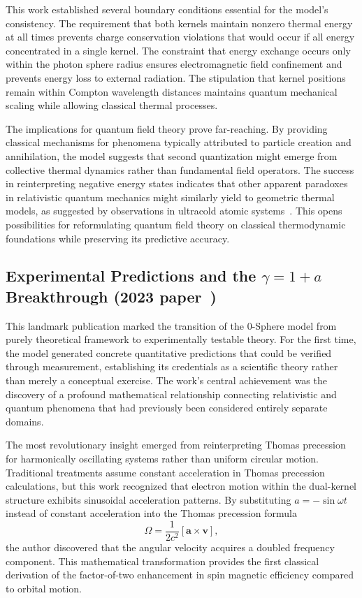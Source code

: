 \documentclass[%
 reprint,
 amsmath,amssymb,
 aps,
]{revtex4-1}
\numberwithin{equation}{section}%
\begin{document}
This work established several boundary conditions essential for the model's consistency. The requirement that both kernels maintain nonzero thermal energy at all times prevents charge conservation violations that would occur if all energy concentrated in a single kernel. The constraint that energy exchange occurs only within the photon sphere radius ensures electromagnetic field confinement and prevents energy loss to external radiation. The stipulation that kernel positions remain within Compton wavelength distances maintains quantum mechanical scaling while allowing classical thermal processes.

The implications for quantum field theory prove far-reaching. By providing classical mechanisms for phenomena typically attributed to particle creation and annihilation, the model suggests that second quantization might emerge from collective thermal dynamics rather than fundamental field operators. The success in reinterpreting negative energy states indicates that other apparent paradoxes in relativistic quantum mechanics might similarly yield to geometric thermal models, as suggested by observations in ultracold atomic systems~\cite{zhang2013}. This opens possibilities for reformulating quantum field theory on classical thermodynamic foundations while preserving its predictive accuracy.

\subsection{Experimental Predictions and the $\gamma = 1 + a$ Breakthrough (2023 paper~\cite{hanamura2309.0047})}

This landmark publication marked the transition of the 0-Sphere model from purely theoretical framework to experimentally testable theory. For the first time, the model generated concrete quantitative predictions that could be verified through measurement, establishing its credentials as a scientific theory rather than merely a conceptual exercise. The work's central achievement was the discovery of a profound mathematical relationship connecting relativistic and quantum phenomena that had previously been considered entirely separate domains.

The most revolutionary insight emerged from reinterpreting Thomas precession for harmonically oscillating systems rather than uniform circular motion. Traditional treatments assume constant acceleration in Thomas precession calculations, but this work recognized that electron motion within the dual-kernel structure exhibits sinusoidal acceleration patterns. By substituting $a = -\sin\omega t$ instead of constant acceleration into the Thomas precession formula
\begin{equation}
\Omega = \frac{1}{2c^2}[\mathbf{a} \times \mathbf{v}],
\end{equation}
the author discovered that the angular velocity acquires a doubled frequency component. This mathematical transformation provides the first classical derivation of the factor-of-two enhancement in spin magnetic efficiency compared to orbital motion.
\end{document}
